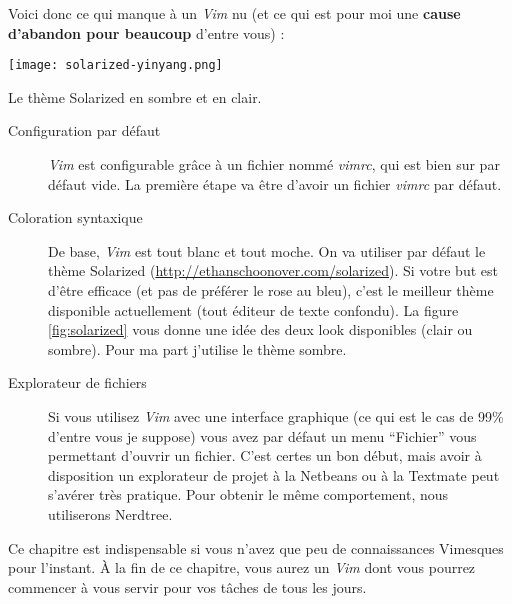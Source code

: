Voici donc ce qui manque à un \emph{Vim} nu (et ce qui est pour moi une \textbf{cause d'abandon pour beaucoup} d'entre vous) :

\begin{marginfigure}%
  \texttt{[image: solarized-yinyang.png]}
  \caption{Le thème Solarized en sombre et en clair.}
  \label{fig:solarized}
\end{marginfigure}

\begin{description}
    \item[Configuration par défaut] \emph{Vim} est configurable grâce à un fichier nommé \emph{vimrc}, qui est bien sur par défaut vide. La première étape va être d'avoir un fichier \emph{vimrc} par défaut.
    \item[Coloration syntaxique] De base, \emph{Vim} est tout blanc et tout moche. On va utiliser par défaut le thème Solarized (\url{http://ethanschoonover.com/solarized}). Si votre but est d'être efficace (et pas de préférer le rose au bleu), c'est le meilleur thème disponible actuellement (tout éditeur de texte confondu). La figure \ref{fig:solarized} vous donne une idée des deux look disponibles (clair ou sombre). Pour ma part j'utilise le thème sombre.
    \item[Explorateur de fichiers] Si vous utilisez \emph{Vim} avec une interface graphique (ce qui est le cas de 99\% d'entre vous je suppose) vous avez par défaut un menu ``Fichier'' vous permettant d'ouvrir un fichier. C'est certes un bon début, mais avoir à disposition un explorateur de projet à la Netbeans ou à la Textmate peut s'avérer très pratique. Pour obtenir le même comportement, nous utiliserons Nerdtree.
\end{description}

Ce chapitre est indispensable si vous n'avez que peu de connaissances Vimesques pour l'instant. À la fin de ce chapitre, vous aurez un \emph{Vim} dont vous pourrez commencer à vous servir pour vos tâches de tous les jours.

\printindex


